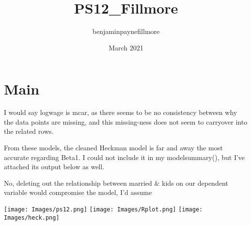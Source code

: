 \documentclass{article}
\title{PS12_Fillmore}
\author{benjaminpaynefillmore }
\date{March 2021}
\begin{document}
\graphicspath{ {./images/} }
\maketitle

\section{Main}

I would say logwage is mcar, as there seems to be no consistency between why the data points are missing, and this missing-ness does not seem to carryover into the related rows.  

From these models, the cleaned Heckman model is far and away the most accurate regarding Beta1. I could not include it in my modelsummary(), but I've attached its output below as well.

No, deleting out the relationship between married & kids on our dependent variable would compromise the model, I'd assume

\texttt{[image: Images/ps12.png]}
\texttt{[image: Images/Rplot.png]}
\texttt{[image: Images/heck.png]}
\end{document}
